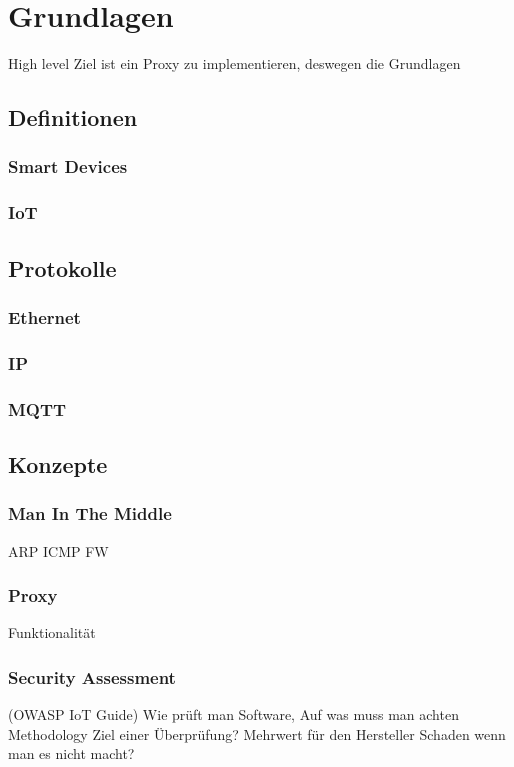 \chapter{Grundlagen}
High level Ziel ist ein Proxy zu implementieren, deswegen die Grundlagen

\section{Definitionen}
    \subsection{Smart Devices}
    \subsection{IoT}

\section{Protokolle}
    \subsection{Ethernet}
    \subsection{IP}
    \subsection{MQTT}

\section{Konzepte}
    \subsection{Man In The Middle}
    ARP
    ICMP
    FW
    \subsection{Proxy}
        Funktionalität
    \subsection{Security Assessment}
        (OWASP IoT Guide) 
        Wie prüft man Software, Auf was muss man achten Methodology %
        Ziel einer Überprüfung?
        Mehrwert für den Hersteller
        Schaden wenn man es nicht macht?
